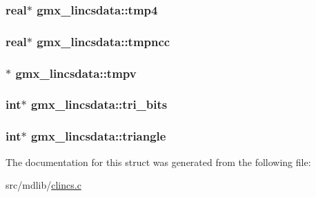 \hypertarget{structgmx__lincsdata_adaa818e4bffd9d9b498abbc2c282162a}{
\subsubsection[{tmp4}]{\setlength{\rightskip}{0pt plus 5cm}real$\ast$ {\bf gmx\-\_\-lincsdata\-::tmp4}}}\label{structgmx__lincsdata_adaa818e4bffd9d9b498abbc2c282162a}
\hypertarget{structgmx__lincsdata_a9f9dca4538c1bcd6805de7d81a6cde89}{
\subsubsection[{tmpncc}]{\setlength{\rightskip}{0pt plus 5cm}real$\ast$ {\bf gmx\-\_\-lincsdata\-::tmpncc}}}\label{structgmx__lincsdata_a9f9dca4538c1bcd6805de7d81a6cde89}
\hypertarget{structgmx__lincsdata_a0dc05497d46a60eeadb80015e5534408}{
\subsubsection[{tmpv}]{$\ast$ {\bf gmx\-\_\-lincsdata\-::tmpv}}}\label{structgmx__lincsdata_a0dc05497d46a60eeadb80015e5534408}
\hypertarget{structgmx__lincsdata_a51db1d8f938cd4557f5903ccfa4e02b4}{
\subsubsection[{tri\-\_\-bits}]{\setlength{\rightskip}{0pt plus 5cm}int$\ast$ {\bf gmx\-\_\-lincsdata\-::tri\-\_\-bits}}}\label{structgmx__lincsdata_a51db1d8f938cd4557f5903ccfa4e02b4}
\hypertarget{structgmx__lincsdata_a6d5e5c671b8bcf7ac7357f418416fece}{
\subsubsection[{triangle}]{\setlength{\rightskip}{0pt plus 5cm}int$\ast$ {\bf gmx\-\_\-lincsdata\-::triangle}}}\label{structgmx__lincsdata_a6d5e5c671b8bcf7ac7357f418416fece}


\-The documentation for this struct was generated from the following file\-:\begin{DoxyCompactItemize}
\item 
src/mdlib/\hyperlink{clincs_8c}{clincs.\-c}\end{DoxyCompactItemize}

